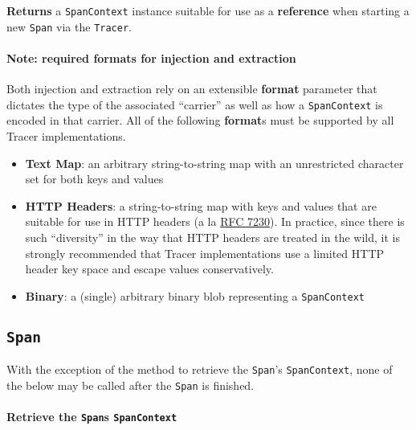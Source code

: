 \documentclass[a4paper,12pt,notitlepage,twoside,openright]{article}
\begin{document}
\textbf{Returns} a \texttt{SpanContext} instance suitable for use as a
\textbf{reference} when starting a new \texttt{Span} via the
\texttt{Tracer}.

\hypertarget{note-required-formats-for-injection-and-extraction}{%
\paragraph{\texorpdfstring{Note: required \textbf{format}s for injection
and
extraction}{Note: required formats for injection and extraction}}\label{note-required-formats-for-injection-and-extraction}}

Both injection and extraction rely on an extensible \textbf{format}
parameter that dictates the type of the associated ``carrier'' as well
as how a \texttt{SpanContext} is encoded in that carrier. All of the
following \textbf{format}s must be supported by all Tracer
implementations.

\begin{itemize}

\item
  \textbf{Text Map}: an arbitrary string-to-string map with an
  unrestricted character set for both keys and values
\item
  \textbf{HTTP Headers}: a string-to-string map with keys and values
  that are suitable for use in HTTP headers (a la
  \href{https://tools.ietf.org/html/rfc7230\#section-3.2.4}{RFC 7230}).
  In practice, since there is such ``diversity'' in the way that HTTP
  headers are treated in the wild, it is strongly recommended that
  Tracer implementations use a limited HTTP header key space and escape
  values conservatively.
\item
  \textbf{Binary}: a (single) arbitrary binary blob representing a
  \texttt{SpanContext}
\end{itemize}

\hypertarget{span}{%
\subsection{\texorpdfstring{\texttt{Span}}{Span}}\label{span}}

With the exception of the method to retrieve the \texttt{Span}'s
\texttt{SpanContext}, none of the below may be called after the
\texttt{Span} is finished.

\hypertarget{retrieve-the-spans-spancontext}{%
\paragraph{\texorpdfstring{Retrieve the \texttt{Span}s
\texttt{SpanContext}}{Retrieve the Spans SpanContext}}\label{retrieve-the-spans-spancontext}}
\end{document}
